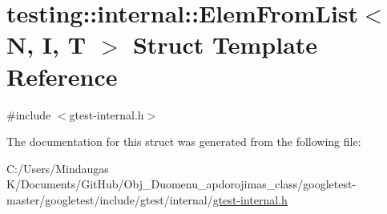\hypertarget{structtesting_1_1internal_1_1_elem_from_list}{}\section{testing\+::internal\+::Elem\+From\+List$<$ N, I, T $>$ Struct Template Reference}
\label{structtesting_1_1internal_1_1_elem_from_list}


{\ttfamily \#include $<$gtest-\/internal.\+h$>$}



The documentation for this struct was generated from the following file\+:\begin{DoxyCompactItemize}
\item 
C\+:/\+Users/\+Mindaugas K/\+Documents/\+Git\+Hub/\+Obj\+\_\+\+Duomenu\+\_\+apdorojimas\+\_\+class/googletest-\/master/googletest/include/gtest/internal/\mbox{\hyperlink{googletest-master_2googletest_2include_2gtest_2internal_2gtest-internal_8h}{gtest-\/internal.\+h}}\end{DoxyCompactItemize}
